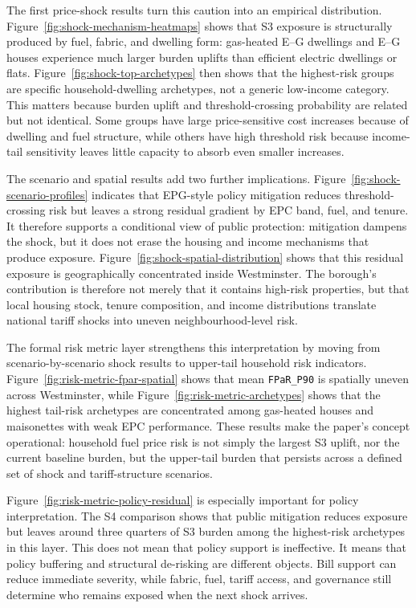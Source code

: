 The first price-shock results turn this caution into an empirical distribution. Figure~\ref{fig:shock-mechanism-heatmaps} shows that S3 exposure is structurally produced by fuel, fabric, and dwelling form: gas-heated E--G dwellings and E--G houses experience much larger burden uplifts than efficient electric dwellings or flats. Figure~\ref{fig:shock-top-archetypes} then shows that the highest-risk groups are specific household-dwelling archetypes, not a generic low-income category. This matters because burden uplift and threshold-crossing probability are related but not identical. Some groups have large price-sensitive cost increases because of dwelling and fuel structure, while others have high threshold risk because income-tail sensitivity leaves little capacity to absorb even smaller increases.

The scenario and spatial results add two further implications. Figure~\ref{fig:shock-scenario-profiles} indicates that EPG-style policy mitigation reduces threshold-crossing risk but leaves a strong residual gradient by EPC band, fuel, and tenure. It therefore supports a conditional view of public protection: mitigation dampens the shock, but it does not erase the housing and income mechanisms that produce exposure. Figure~\ref{fig:shock-spatial-distribution} shows that this residual exposure is geographically concentrated inside Westminster. The borough's contribution is therefore not merely that it contains high-risk properties, but that local housing stock, tenure composition, and income distributions translate national tariff shocks into uneven neighbourhood-level risk.

The formal risk metric layer strengthens this interpretation by moving from scenario-by-scenario shock results to upper-tail household risk indicators. Figure~\ref{fig:risk-metric-fpar-spatial} shows that mean \texttt{FPaR\_P90} is spatially uneven across Westminster, while Figure~\ref{fig:risk-metric-archetypes} shows that the highest tail-risk archetypes are concentrated among gas-heated houses and maisonettes with weak EPC performance. These results make the paper's concept operational: household fuel price risk is not simply the largest S3 uplift, nor the current baseline burden, but the upper-tail burden that persists across a defined set of shock and tariff-structure scenarios.

Figure~\ref{fig:risk-metric-policy-residual} is especially important for policy interpretation. The S4 comparison shows that public mitigation reduces exposure but leaves around three quarters of S3 burden among the highest-risk archetypes in this layer. This does not mean that policy support is ineffective. It means that policy buffering and structural de-risking are different objects. Bill support can reduce immediate severity, while fabric, fuel, tariff access, and governance still determine who remains exposed when the next shock arrives.


